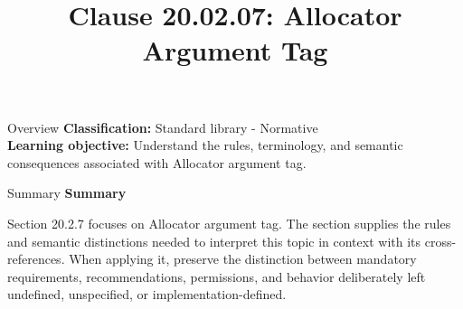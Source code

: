 \documentclass[10pt,letterpaper]{article}
\title{Clause 20.02.07: Allocator Argument Tag}
\author{}
\date{}
\begin{document}
\maketitle
\begin{CornellOverviewBox}{Overview}
\textbf{Classification:} Standard library - Normative\\[2pt]
\textbf{Learning objective:} Understand the rules, terminology, and semantic consequences associated with Allocator argument tag.
\end{CornellOverviewBox}\begin{CornellSummaryBox}{Summary}
{\sffamily\bfseries\color{Accent} Summary}\par\vspace{3pt}Section 20.2.7 focuses on Allocator argument tag. The section supplies the rules and semantic distinctions needed to interpret this topic in context with its cross-references. When applying it, preserve the distinction between mandatory requirements, recommendations, permissions, and behavior deliberately left undefined, unspecified, or implementation-defined.
\end{CornellSummaryBox}
\end{document}
